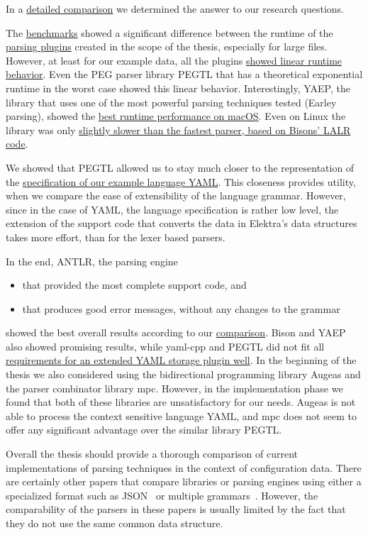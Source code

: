 In a \hyperref[sec:comparison]{detailed comparison} we determined the answer to our research questions.

\speed*

The \hyperref[sec:run_time_performance]{benchmarks} showed a significant difference between the runtime of the \hyperref[sec:implementation]{parsing plugins} created in the scope of the thesis, especially for large files. However, at least for our example data, all the plugins \hyperref[fig:benchmark_results_generated_above_1000]{showed linear runtime behavior}. Even the PEG parser library \gls{PEGTL} that has a theoretical exponential runtime in the worst case showed this linear behavior. Interestingly, \gls{YAEP}, the library that uses one of the most powerful parsing techniques tested (Earley parsing), showed the \hyperref[fig:benchmark_generated]{best runtime performance on macOS}. Even on Linux the library was only \hyperref[fig:benchmark_generated]{slightly slower than the fastest parser, based on Bisons’ LALR code}.

\closeness*

We showed that \gls{PEGTL} allowed us to stay much closer to the representation of the \href{http://yaml.org/spec/1.2/spec.html}{specification of our example language YAML}. This closeness provides utility, when we compare the ease of extensibility of the language grammar. However, since in the case of YAML, the language specification is rather low level, the extension of the support code that converts the data in Elektra’s data structures takes more effort, than for the lexer based parsers.

In the end, \gls{ANTLR}, the parsing engine

\begin{itemize}
  \item that provided the most complete support code, and
  \item that produces good error messages, without any changes to the grammar
\end{itemize}

showed the best overall results according to our \hyperref[sec:comparison]{comparison}. Bison and \gls{YAEP} also showed promising results, while yaml-cpp and PEGTL did not fit all \hyperref[sec:requirements_extended_yaml_plugin]{requirements for an extended YAML storage plugin well}. In the beginning of the thesis we also considered using the bidirectional programming library Augeas and the parser combinator library mpc. However, in the implementation phase we found that both of these libraries are unsatisfactory for our needs. Augeas is not able to process the context sensitive language YAML, and mpc does not seem to offer any significant advantage over the similar library \gls{PEGTL}.

Overall the thesis should provide a thorough comparison of current implementations of parsing techniques in the context of configuration data. There are certainly other papers that compare libraries or parsing engines using either a specialized format such as JSON~\cite{json2019geoff} or multiple grammars~\cite{chen2011full, flodin2014packrat}. However, the comparability of the parsers in these papers is usually limited by the fact that they do not use the same common data structure.
